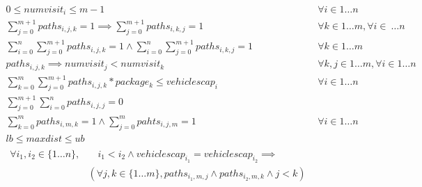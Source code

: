 \documentclass{article}
\begin{document}
\begin{align}
	0 \le numvisit_i \le m-1 \quad & \forall i \in 1 \ldots n \label{eq:1} \\
	\sum_{j=0}^{m+1}{paths_{i,j,k}} = 1 \implies \sum_{j=0}^{m+1}{paths_{i,k,j} = 1} \quad & \forall k \in 1 \ldots m, \forall i \in \ \ldots n \label{eq:2} \\
	\sum_{i=0}^{n}\sum_{j=0}^{m+1}{paths_{i,j,k}} = 1 \land \sum_{i=0}^{n}\sum_{j=0}^{m+1}{paths_{i,k,j}} = 1 \quad & \forall k \in 1 \ldots m \label{eq:3} \\
	paths_{i,j,k} \implies numvisit_j < numvisit_k \quad & \forall k,j \in 1 \ldots m, \forall i \in 1 \ldots n \label{eq:4} \\
	\sum_{k = 0}^{m}\sum_{j=0}^{m+1}{paths_{i,j,k} * package_k} \le vehiclescap_i \quad & \forall i \in 1 \ldots n \label{eq:5}\\
	\sum_{j=0}^{m+1}\sum_{i=0}^{n}{paths_{i,j,j}} = 0 \label{eq:6}\\
	\sum_{k=0}^{m}{paths_{i,m,k}} = 1 \land \sum_{j=0}^{m}{pahts_{i,j,m}} = 1 \quad & \forall i \in 1 \ldots n \label{eq:7} \\
	lb \le maxdist \le ub \label{eq:8}\\
	\begin{aligned}
		\forall i_1, i_2 \in \{1 \ldots n\}, & \quad i_1 < i_2 \land vehiclescap_{i_1} = vehiclescap_{i_2} \implies \\
		& (\forall j, k \in \{1 \ldots m\}, paths_{i_1,m,j} \land paths_{i_2, m,k} \land j < k) 
	\end{aligned} \label{eq:9}
\end{align}
\end{document}
